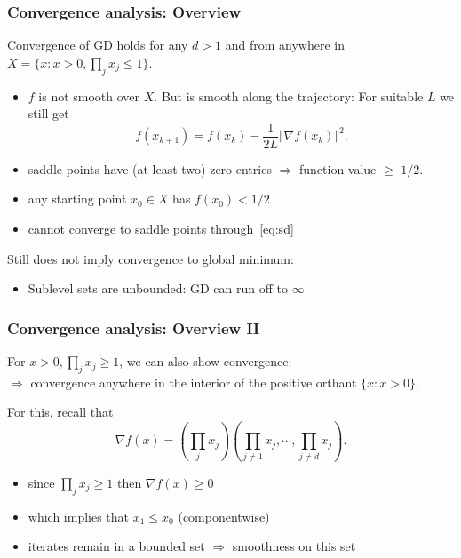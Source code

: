 \documentclass[aspectratio=149]{beamer}
\begin{document}
\begin{frame}
  \frametitle{Convergence analysis: Overview}
  Convergence of GD holds for any $d>1$ and from anywhere in $X=\{x: x> 0, \prod_j x_j \le 1\}$.
  \begin{itemize}
    \item $f$ is not smooth over $X$.
          But is smooth along the trajectory: For suitable $L$ we still get
          \begin{equation}\tag{SD}
            \label{eq:sd}
            f(x_{k+1}) = f(x_k) - \frac{1}{2L} \Vert \nabla f(x_k) \Vert^2.
          \end{equation}
    \item saddle points have (at least two) zero entries $\Rightarrow$ function value $\ge$ $1/2$.
    \item any starting point $x_0 \in X$ has $f(x_0) < 1/2$
    \item cannot converge to saddle points through~\eqref{eq:sd}
  \end{itemize}

  Still does not imply convergence to global minimum:
  \begin{itemize}
    \item Sublevel sets are unbounded: GD can run off to $\infty$
  \end{itemize}

\end{frame}


\begin{frame}
  \frametitle{Convergence analysis: Overview II}

  For $x> 0, \prod_j x_j \ge 1$, we can also show convergence: \\
  $\Rightarrow$ convergence anywhere in the interior of the positive orthant $\{x: x> 0\}$.

  For this, recall that
  \begin{equation}
    \nabla f(x) = \left( \prod_j x_j \right) \left( \prod_{j\neq1} x_j, \cdots, \prod_{j\neq d}x_j \right).
  \end{equation}

  \begin{itemize}
    \item since $\prod_j x_j \ge 1$ then $\nabla f(x) \ge 0$
    \item which implies that $x_{1} \le x_0$ (componentwise)
    \item iterates remain in a bounded set $\Rightarrow$ smoothness on this set
  \end{itemize}

\end{frame}
\end{document}
